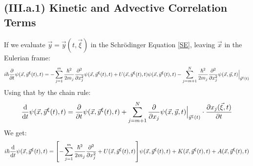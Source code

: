 \documentclass[11pt, a4paper]{article} %
\begin{document}
\subsection*{(III.a.1) Kinetic and Advective Correlation Terms}
If we evaluate $\vec{y}=\vec{y}(t,\vec{\xi})$ in the Schrödinger Equation \eqref{SE}, leaving $\vec{x}$ in the Eulerian frame:
\begin{equation}
i\hbar \pdv{}{t}\psi(\vec{x}, \vec{y}^\xi(t),t)=-\sum_{j=1}^m \frac{\hbar^2}{2m_j}\pdv[2]{}{x_j} \psi(\vec{x}, \vec{y}^\xi(t),t) + U(\vec{x}, \vec{y}^\xi(t),t)\psi(\vec{x}, \vec{y}^\xi(t),t) -\sum_{j=m+1}^N \frac{\hbar^2}{2m_j}\pdv[2]{}{x_j} \psi(\vec{x}, \vec{y},t)\Big\rvert_{\vec{y}^\xi(t)}
\end{equation}
Using that by the chain rule:
\begin{equation}
\dv{}{t}\psi(\vec{x}, \vec{y}^\xi(t),t)=\pdv{}{t}\psi(\vec{x}, \vec{y}^\xi(t),t)+\sum_{j=m+1}^N \pdv{}{x_j}\psi(\vec{x}, \vec{y},t)\Big\rvert_{\vec{y}^\xi(t)}\cdot \pdv{x_j(\vec{\xi},t)}{t}
\end{equation}
We get:
\begin{equation}\label{KinAdvEL}
i\hbar \dv{}{t}\psi(\vec{x}, \vec{y}^\xi(t),t)=\qty[-\sum_{j=1}^m \frac{\hbar^2}{2m_j}\pdv[2]{}{x_j} + U(\vec{x}, \vec{y}^\xi(t),t)]\psi(\vec{x}, \vec{y}^\xi(t),t)+K(\vec{x}, \vec{y}^\xi(t),t)+A(\vec{x}, \vec{y}^\xi(t),t)
\end{equation}
\end{document}

